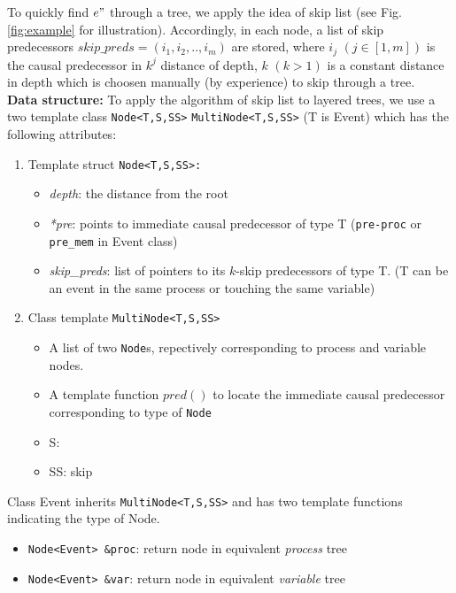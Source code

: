 \documentclass{llncs}
\begin{document}
\noindent
To quickly find $e"$ through a tree, we apply the idea of skip list (see Fig.\ref{fig:example} for illustration).
Accordingly, in each node, a list of skip predecessors $
skip\_preds = (i_1, i_2,..,i_m)$ are stored, where $i_j$ $(j \in [1,m] )$ is the causal predecessor in $k^{j}$ distance of depth, $k$ $(k > 1)$ is a constant distance in depth which is choosen manually (by experience) to skip through a tree.\\

\noindent
\textbf{Data structure:}
To apply the algorithm of skip list to layered trees, we use a two template class \verb!Node<T,S,SS>! \verb!MultiNode<T,S,SS>! (T is Event) which has the following attributes:
\begin{enumerate}
\item 
	Template struct \verb!Node<T,S,SS>:!
	\begin{itemize}
		\item \textit{depth}: the distance from the root
		\item \textit{*pre}: points to immediate causal predecessor of type T (\verb!pre-proc! or \verb!pre_mem! in Event class)
		\item \textit{skip\_preds}: list of pointers to its $k$-skip predecessors of type T.	
		(T can be an event in the same process or touching the same variable)
	\end{itemize}
\item
	Class template \verb!MultiNode<T,S,SS>!
	\begin{itemize}
	\item
		A list of two \verb!Node!s, repectively corresponding to process and variable nodes.
	\item
		A template function $pred()$ to locate the immediate causal predecessor corresponding to type of \verb!Node!
	\item
		S: 
	\item
		SS: skip
	\end{itemize}
\end{enumerate}

\noindent
Class Event inherits \verb!MultiNode<T,S,SS>! and has two template functions indicating the type of Node.
\begin{itemize}
\item
	\verb!Node<Event> &proc!: return node in equivalent \textit{process} tree
\item	
	\verb!Node<Event> &var!: return node in equivalent \textit{variable} tree 	
\end{itemize}
\end{document}
